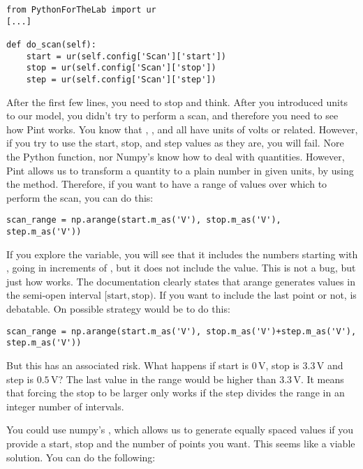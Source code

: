 \begin{verbatim}
from PythonForTheLab import ur
[...]

def do_scan(self):
    start = ur(self.config['Scan']['start'])
    stop = ur(self.config['Scan']['stop'])
    step = ur(self.config['Scan']['step'])
\end{verbatim}

After the first few lines, you need to stop and think. After you introduced units to our model, you didn't try to perform a scan, and therefore you need to see how Pint works. You know that , , and  all have units of volts or related. However, if you try to use the start, stop, and step values as they are, you will fail. Nore the Python  function, nor Numpy's  know how to deal with quantities. However, Pint allows us to transform a quantity to a plain number in given units, by using the  method. Therefore, if you want to have a range of values over which to perform the scan, you can do this:

\begin{verbatim}
scan_range = np.arange(start.m_as('V'), stop.m_as('V'), step.m_as('V'))
\end{verbatim}

If you explore the  variable, you will see that it includes the numbers starting with , going in increments of , but it does not include the  value. This is not a bug, but just how  works. The documentation clearly states that arange generates values in the semi-open interval $[\textrm{start}, \textrm{stop})$. If you want to include the last point or not, is debatable. On possible strategy would be to do this:

\begin{verbatim}
scan_range = np.arange(start.m_as('V'), stop.m_as('V')+step.m_as('V'), step.m_as('V'))
\end{verbatim}

But this has an associated risk. What happens if start is $0\,\textrm{V}$, stop is $3.3\,\textrm{V}$ and step is $0.5\,\textrm{V}$? The last value in the range would be higher than $3.3\,\textrm{V}$. It means that forcing the stop to be larger only works if the step divides the range in an integer number of intervals.

You could use numpy's , which allows us to generate equally spaced values if you provide a start, stop and the number of points you want. This seems like a viable solution. You can do the following:

